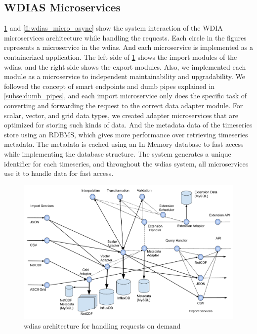 \subsection{WDIAS Microservices}
\label{sebse:wdias_microservices}

\cref{fi:wdias_micro_on_demand} and \cref{fi:wdias_micro_async} show the system interaction of the WDIA microservices architecture while handling the requests. Each circle in the figures represents a microservice in the \acrshort{wdias}. And each microservice is implemented as a containerized application. The left side of \cref{fi:wdias_micro_on_demand} shows the import modules of the \acrshort{wdias}, and the right side shows the export modules. Also, we implemented each module as a microservice to independent maintainability and upgradability. We followed the concept of smart endpoints and dumb pipes explained in \cref{subse:dumb_pipes}, and each import microservice only does the specific task of converting and forwarding the request to the correct data adapter module. For scalar, vector, and grid data types, we created adapter microservices that are optimized for storing such kinds of data. And the metadata data of the timeseries store using an RDBMS, which gives more performance over retrieving timeseries metadata. The metadata is cached using an In-Memory database to fast access while implementing the database structure. The system generates a unique identifier for each timeseries, and throughout the \acrshort{wdias} system, all microservices use it to handle data for fast access.

\begin{figure}[htp]
    \centering
    \includegraphics[width=1\textwidth]{method/microservice/microservice_architecture-handle_on_demand-v4.pdf}
    \caption{\acrshort{wdias} architecture for handling requests on demand}
    \label{fi:wdias_micro_on_demand}
\end{figure}

